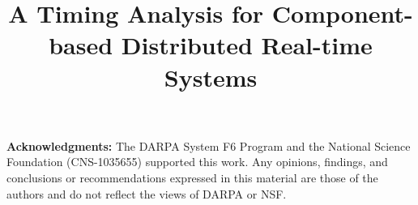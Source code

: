 \documentclass[10pt,conference]{IEEEtran}
\begin{document}
\title{ A Timing Analysis for Component-based Distributed Real-time Systems }
\vspace{-0.1in}
\author{ 
}


\setcounter{page}{1}
\maketitle










\textbf{Acknowledgments:} The DARPA System F6 Program and the National
Science Foundation (CNS-1035655) supported
this work. Any opinions, findings, and conclusions or recommendations expressed
in this material are those of the authors and do not reflect the views of
DARPA or NSF. 
\balance
\begin{spacing}{0.88}


\end{spacing}
\end{document}
